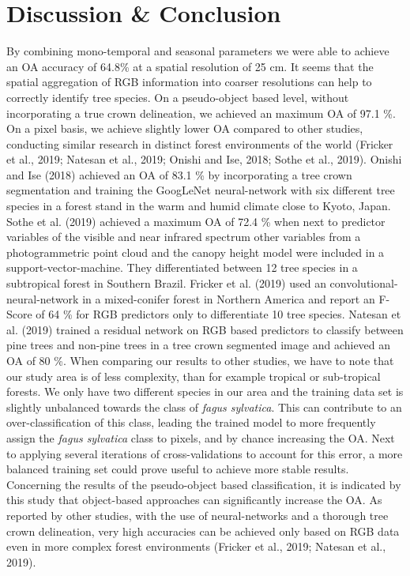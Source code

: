 \documentclass[]{article}
\begin{document}
\hypertarget{discussion-conclusion}{%
\section{Discussion \& Conclusion}\label{discussion-conclusion}}

By combining mono-temporal and seasonal parameters we were able to
achieve an OA accuracy of 64.8\% at a spatial resolution of 25 cm. It
seems that the spatial aggregation of RGB information into coarser
resolutions can help to correctly identify tree species. On a
pseudo-object based level, without incorporating a true crown
delineation, we achieved an maximum OA of 97.1 \%. On a pixel basis, we
achieve slightly lower OA compared to other studies, conducting similar
research in distinct forest environments of the world (Fricker et al.,
2019; Natesan et al., 2019; Onishi and Ise, 2018; Sothe et al., 2019).
Onishi and Ise (2018) achieved an OA of 83.1 \% by incorporating a tree
crown segmentation and training the GoogLeNet neural-network with six
different tree species in a forest stand in the warm and humid climate
close to Kyoto, Japan. Sothe et al. (2019) achieved a maximum OA of 72.4
\% when next to predictor variables of the visible and near infrared
spectrum other variables from a photogrammetric point cloud and the
canopy height model were included in a support-vector-machine. They
differentiated between 12 tree species in a subtropical forest in
Southern Brazil. Fricker et al. (2019) used an
convolutional-neural-network in a mixed-conifer forest in Northern
America and report an F-Score of 64 \% for RGB predictors only to
differentiate 10 tree species. Natesan et al. (2019) trained a residual
network on RGB based predictors to classify between pine trees and
non-pine trees in a tree crown segmented image and achieved an OA of 80
\%. When comparing our results to other studies, we have to note that
our study area is of less complexity, than for example tropical or
sub-tropical forests. We only have two different species in our area and
the training data set is slightly unbalanced towards the class of
\emph{fagus sylvatica}. This can contribute to an over-classification of
this class, leading the trained model to more frequently assign the
\emph{fagus sylvatica} class to pixels, and by chance increasing the OA.
Next to applying several iterations of cross-validations to account for
this error, a more balanced training set could prove useful to achieve
more stable results. Concerning the results of the pseudo-object based
classification, it is indicated by this study that object-based
approaches can significantly increase the OA. As reported by other
studies, with the use of neural-networks and a thorough tree crown
delineation, very high accuracies can be achieved only based on RGB data
even in more complex forest environments (Fricker et al., 2019; Natesan
et al., 2019).
\end{document}
